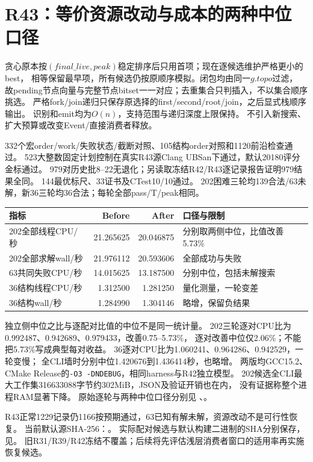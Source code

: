 \documentclass[UTF8,fontset=fandol,11pt]{ctexart}
\begin{document}
\section{R43：等价资源改动与成本的两种中位口径}
贪心原本按$(final\_live,peak)$稳定排序后只用首项；现在逐候选维护严格更小的best，
相等保留最早项，所有候选仍按原顺序模拟。闭包均由同一$g.topo$过滤，
故pending节点向量与完整节点bitset一一对应；去重集合只判插入，不以集合顺序挑选。
严格fork/join递归只保存原选择的first/second/root/join，之后显式栈顺序输出。
识别和emit均为$O(n)$，支持范围与递归深度上限保持。
不引入新搜索、扩大预算或改变Event/直接消费者释放。

332个宏order/work/失败状态/截断对照、105结构order对照和1120前沿检查通过。
523大整数固定计划控制在真实R43源Clang UBSan下通过，默认20180评分金标通过。
979对历史批8--22无退化；另读取冻结R42/R43逐记录报告证明979结果全同。
144最优标尺、33证书及CTest10/10通过。
202困难三轮均139合法/63未解，新36三轮均36合法；每轮全部pass/T/peak相同。

\begin{tabularx}{\textwidth}{L{4.0cm}rrX}
\toprule
指标 & Before & After & 口径与限制\\
\midrule
202全部线程CPU/秒 & 21.265625 & 20.046875 & 分别取两侧中位，比值改善5.73\%\\
202全部求解wall/秒 & 21.976112 & 20.593606 & 全部成功与失败\\
63共同失败CPU/秒 & 14.015625 & 13.187500 & 分别中位，包括未解搜索\\
36结构线程CPU/秒 & 1.312500 & 1.281250 & 量化测量，一轮变差\\
36结构wall/秒 & 1.284990 & 1.304146 & 略增，保留负结果\\
\bottomrule
\end{tabularx}

独立侧中位之比与逐配对比值的中位不是同一统计量。
202三轮逐对CPU比为0.992487、0.942689、0.979433，改善0.75--5.73\%，
逐对改善中位仅2.06\%；不能把5.73\%写成典型每对收益。
36逐对CPU比为1.060241、0.964286、0.942529，一轮变慢；
全CLI墙时分别中位1.420676到1.436414秒，也略增。
两版均GCC15.2、CMake Release的\texttt{-O3 -DNDEBUG}，相同harness与R42独立模型。
202候选全CLI最大工作集316633088字节约302MiB，JSON及验证开销也在内，
没有证据称整个进程RAM显著下降。
原始逐轮与两种中位口径分别见
、。

R43正常1229记录仍1166按预期通过，63已知有解未解，资源改动不是可行性恢复。
当前默认源SHA-256：。
实际配对候选与默认构建二进制的SHA分别保存，见。
旧R31/R39/R42冻结不覆盖；后续将先评估浅层消费者窗口的适用率再实施恢复候选。
\end{document}
